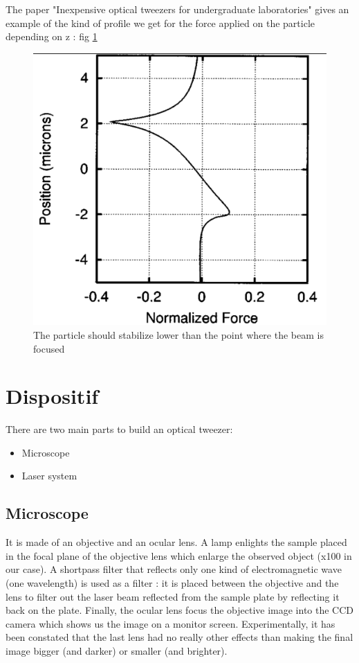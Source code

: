 \documentclass[a4paper,12pt,twoside]{article}	%
\begin{document}
The paper "Inexpensive optical tweezers for undergraduate laboratories" gives an example of the kind of profile we get for the force applied on the particle depending on z : fig \ref{fig:force_prof}

\begin{figure}[h!]
	\begin{center}
	\includegraphics[width=0.5\linewidth,angle=0]{./figures/force_profile}
	\caption{The particle should stabilize lower than the point where the beam is focused} \label{fig:force_prof}
	\end{center}
\end{figure}




\section{Dispositif}
There are two main parts to build an optical tweezer:
\begin{itemize}
	\item Microscope
	\item Laser system
\end{itemize}

\subsection{Microscope}
It is made of an objective and an ocular lens. A lamp enlights the sample placed in the focal plane of the objective lens which enlarge the observed object (x100 in our case). A shortpass filter that reflects only one kind of electromagnetic wave (one wavelength) is used as a filter : it is placed between the objective and the lens to filter out the laser beam reflected from the sample plate by reflecting it back on the plate. Finally, the ocular lens focus the objective image into the CCD camera which shows us the image on a monitor screen. Experimentally, it has been constated that the last lens had no really other effects than making the final image bigger (and darker) or smaller (and brighter).
\end{document}
